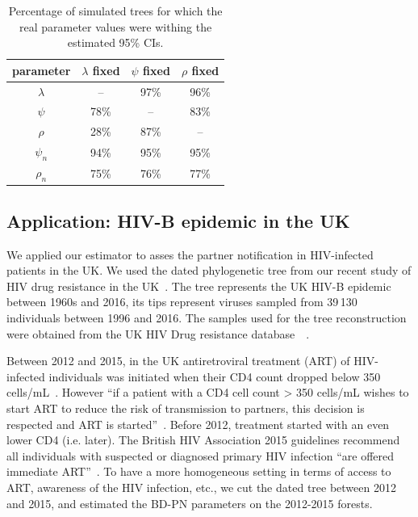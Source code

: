 \documentclass[a4paper,10pt]{article}
\begin{document}
 \begin{table}[!h]\centering
\small
\caption{Percentage of simulated trees for which the real parameter values were withing the estimated 95\% CIs. \smallskip}
\begin{tabular}{c|ccc}
\textbf{parameter} & \textbf{$\lambda$ fixed} & \textbf{$\psi$ fixed} & \textbf{$\rho$ fixed} \\
\toprule 
 $\lambda$ & -- &  97\% & 96\% \\
 $\psi$ & 78\% & -- & 83\% \\
 $\rho$ & 28\% & 87\%  & -- \\
 $\psi_n$ & 94\% & 95\% & 95\% \\
 $\rho_n$ & 75\% & 76\% & 77\% \\
\bottomrule
\end{tabular}
\label{tbl:ci}
\end{table}

\subsection{Application: HIV-B epidemic in the UK}
We applied our estimator to asses the partner notification in HIV-infected patients in the UK. We used the dated phylogenetic tree from our recent study of HIV drug resistance in the UK~\citep{zhukovaModelingDrugResistance2023}. The tree represents the UK HIV-B epidemic between 1960s and 2016, its tips represent viruses sampled from 39\,130 individuals between 1996 and 2016. The samples used for the tree reconstruction were obtained from the UK HIV Drug resistance database~\citep{Dunn2007}~\citep{zhukovaModelingDrugResistance2023}. 

Between 2012 and 2015, in the UK antiretroviral treatment (ART) of HIV-infected individuals  was initiated when their CD4 count dropped below 350 cells/mL~\citep{williamsBritishHIVAssociation2012}. However ``if a patient with a CD4 cell count > 350 cells/mL wishes to start ART to reduce the risk of transmission to partners, this decision is respected and ART is started''~\citep{williamsBritishHIVAssociation2012}. Before 2012, treatment started with an even lower CD4 (i.e. later). The British HIV Association 2015 guidelines recommend all individuals with suspected or diagnosed primary HIV infection ``are offered immediate ART''~\citep{churchillBritishHIVAssociation2016}. To have a more homogeneous setting in terms of access to ART, awareness of the HIV infection, etc., we cut the dated tree between 2012 and 2015, and estimated the BD-PN parameters on the 2012-2015 forests. 
\end{document}
